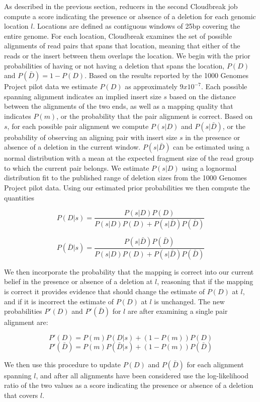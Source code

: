 \documentclass[12pt]{article}
\begin{document}
As described in the previous section, reducers in the second Cloudbreak job compute a score indicating the presence or absence of a deletion for each genomic location $l$. Locations are defined as contiguous windows of 25bp covering the entire genome. For each location, Cloudbreak examines the set of possible alignments of read pairs that spans that location, meaning that either of the reads or the insert between them overlaps the location. We begin with the prior probabilities of having or not having a deletion that spans the location, $P(D)$ and $P(\bar{D}) = 1 - P(D)$. Based on the results reported by the 1000 Genomes Project pilot data \cite{Mills:2011p1611} we estimate $P(D)$ as approximately $9x10^{-7}$. Each possible spanning alignment indicates an implied insert size $s$ based on the distance between the alignments of the two ends, as well as a mapping quality that indicates $P(m)$, or the probability that the pair alignment is correct. Based on $s$, for each possible pair alignment we compute $P(s|D)$ and $P(s|\bar{D})$, or the probability of observing an aligning pair with insert size $s$ in the presence or absence of a deletion in the current window. $P(s|{\bar{D}})$ can be estimated using a normal distribution with a mean at the expected fragment size of the read group to which the current pair belongs. We estimate $P(s|D)$ using a lognormal distribution fit to the published range of deletion sizes from the 1000 Genomes Project pilot data. Using our estimated prior probabilities we then compute the quantities

\[ 
P(D|s) = \frac{P(s|D)P(D)} {P(s|D)P(D) + P(s|\bar{D})P(\bar{D})}
\]

\[ 
P(\bar{D}|s) = \frac{P(s|\bar{D})P(\bar{D})}{P(s|D)P(D) + P(s|\bar{D})P(\bar{D})} 
\]

We then incorporate the probability that the mapping is correct into our current belief in the presence or absence of a deletion at $l$, reasoning that if the mapping is correct it provides evidence that should change the estimate of $P(D)$ at $l$, and if it is incorrect the estimate of $P(D)$ at $l$ is unchanged. The new probabilities $P'(D)$ and $P'(\bar{D})$ for $l$ are after examining a single pair alignment are:

\[ P'(D) = P(m)P(D|s) + (1 - P(m))P(D) \]
\[ P'(\bar{D}) = P(m)P(\bar{D}|s) + (1 - P(m))P(\bar{D}) \]

We then use this procedure to update $P(D)$ and $P(\bar{D})$ for each alignment spanning $l$, and after all alignments have been considered use the log-likelihood ratio of the two values as a score indicating the presence or absence of a deletion that covers $l$.
\end{document}
